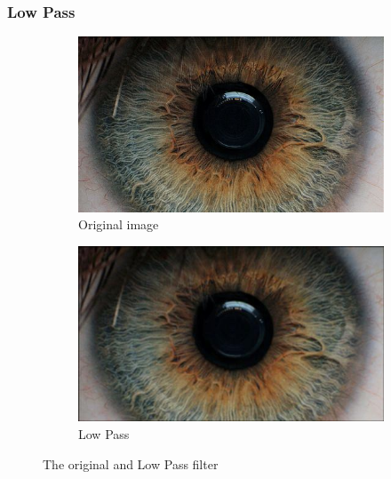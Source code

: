\documentclass{article}
\begin{document}
\subsubsection{Low Pass}




\begin{figure}[H]
\centering

\begin{subfigure}{.5\textwidth}
  \centering
  \includegraphics[width=0.9\linewidth]{res/index.jpg}
  \caption{Original image}
  \label{fig:original_img}
\end{subfigure}%
\begin{subfigure}{.5\textwidth}
  \centering
  \includegraphics[width=0.9\linewidth]{res/low_pass.jpg}
  \caption{Low Pass}
  \label{fig:gray_img}
\end{subfigure}

\caption{The original and Low Pass filter}
\label{fig:source_img}
\end{figure}
\end{document}
